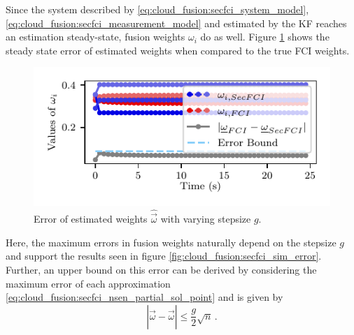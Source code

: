 Since the system described by \eqref{eq:cloud_fusion:secfci_system_model}, \eqref{eq:cloud_fusion:secfci_measurement_model} and estimated by the KF reaches an estimation steady-state, fusion weights $\omega_i$ do as well. Figure \ref{fig:cloud_fusion:secfci_omega_error} shows the steady state error of estimated weights when compared to the true FCI weights. 
\begin{figure}[htbp]
    \centering
    \includegraphics{figures/omegas_cmp.pdf}
    \caption{Error of estimated weights $\hat{\vec{\omega}}$ with varying stepsize $g$.}
    \label{fig:cloud_fusion:secfci_omega_error}
\end{figure}
Here, the maximum errors in fusion weights naturally depend on the stepsize $g$ and support the results seen in figure \ref{fig:cloud_fusion:secfci_sim_error}. Further, an upper bound on this error can be derived by considering the maximum error of each approximation \eqref{eq:cloud_fusion:secfci_nsen_partial_sol_point} and is given by
\begin{equation}
    \left|\hat{\vec{\omega}} - \vec{\omega}\right| \leq \frac{g}{2}\sqrt{n}\,.
\end{equation}

% 
%                                                                                           
%                                                                                           
%                                                                                           
% 

